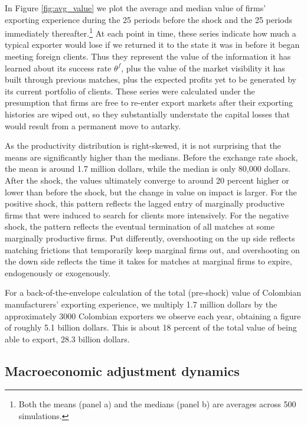 \documentclass[12pt]{article}
\begin{document}
In Figure \ref{fig:avg_value} we plot the average and median value of firms' exporting experience during the 25 periods before the shock and the 25 periods immediately thereafter.\footnote{%
Both the means (panel a) and the medians (panel b) are averages across 500 simulations.\medskip} At each point in time, these series indicate how much a typical exporter would lose if we returned it to the state it was in before it began meeting foreign clients. Thus they represent the value of the information it has learned about its success rate $\theta ^{f}$, plus the value of the market visibility it has built through previous matches, plus the expected profits yet to be generated by its current portfolio of clients. These series were calculated under the presumption that firms are free to re-enter export markets after their exporting histories are wiped out, so they substantially understate the capital losses that would result from a permanent move to autarky.

As the productivity distribution is right-skewed, it is not surprising that the means are significantly higher than the medians. Before the exchange rate
shock, the mean is around 1.7 million dollars, while the median is only 80,000
dollars. After the shock, the values ultimately converge to
around 20 percent higher or lower than before the shock, but the change in
value on impact is larger. For the positive shock, this pattern reflects the lagged entry of marginally productive firms that were induced to search for clients more intensively. For the negative shock, the pattern reflects the eventual termination of all matches at some marginally productive firms. Put differently, overshooting on the up side reflects matching frictions that temporarily keep marginal firms out, and overshooting on the down side reflects the time it takes for matches at marginal firms to expire, endogenously or exogenously.

For a back-of-the-envelope calculation of the total (pre-shock) value of Colombian manufacturers' exporting experience, we multiply 1.7 million dollars by the approximately 3000 Colombian exporters we observe each year, obtaining a figure of roughly 5.1 billion dollars. This is about 18 percent of the total value of being able to export, 28.3 billion dollars. 

\subsection{Macroeconomic adjustment dynamics}
\end{document}
